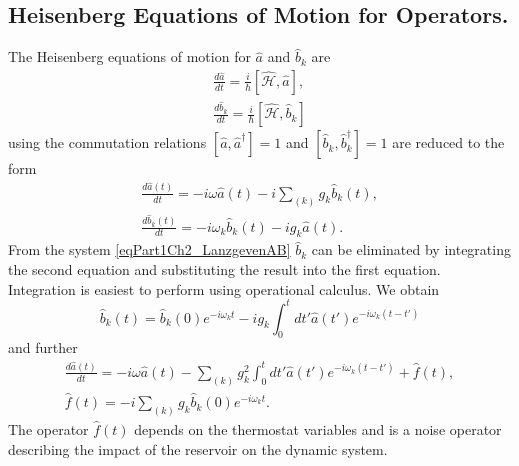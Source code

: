 \subsection{Heisenberg Equations of Motion for Operators.}
The Heisenberg equations of motion for $\hat{a}$ and $\hat{b}_{k}$ are
\begin{eqnarray}
\frac{d \hat{a}}{d t} = \frac{i}{\hbar}\left[
 \hat{\mathcal{H}}, \hat{a}
\right],
\nonumber \\
\frac{d \hat{b}_k}{d t} = \frac{i}{\hbar}\left[
 \hat{\mathcal{H}}, \hat{b}_k
\right]
\nonumber
\end{eqnarray}
using the commutation relations 
$\left[\hat{a}, \hat{a}^{\dag}\right] = 1$ and 
$\left[\hat{b}_k, \hat{b}_{k}^{\dag}\right] = 1$ are reduced to the form
\begin{eqnarray}
\frac{d \hat{a}\left(t\right)}{d t} = -i \omega \hat{a}\left(t\right) - i\sum_{(k)}g_k
\hat{b}_k\left(t\right),
\nonumber \\
\frac{d \hat{b}_k\left(t\right)}{d t} = -i \omega_k
\hat{b}_{k}\left(t\right) - i g_k \hat{a}\left(t\right).
\label{eqPart1Ch2_LanzgevenAB}
\end{eqnarray}
From the system \eqref{eqPart1Ch2_LanzgevenAB} $\hat{b}_k$ can be eliminated by integrating the second equation and substituting the result into the first equation. Integration is easiest to perform using operational calculus. We obtain
\begin{equation}
\hat{b}_k\left(t\right) = 
\hat{b}_k\left(0\right) e^{-i \omega_k t} 
- i g_k \int_0^t d t' \hat{a}\left(t'\right)e^{-i \omega_k\left(t - t'\right)}
\nonumber
\end{equation}
and further
\begin{eqnarray}
\frac{d \hat{a}\left(t\right)}{dt} = 
- i \omega \hat{a}\left(t\right) - \sum_{(k)} g_k^2 \int_0^t
d t'  \hat{a}\left(t'\right)e^{-i \omega_k\left(t - t'\right)}
+ \hat{f}\left(t\right),
\nonumber \\
\hat{f}\left(t\right) = -i \sum_{(k)} g_k \hat{b}_k\left(0\right)
e^{-i \omega_k t}.
\label{eqPart1Ch2_LanzgevenA}
\end{eqnarray}
The operator $\hat{f}\left(t\right)$ depends on the thermostat variables and is a noise operator describing the impact of the reservoir on the dynamic system.

